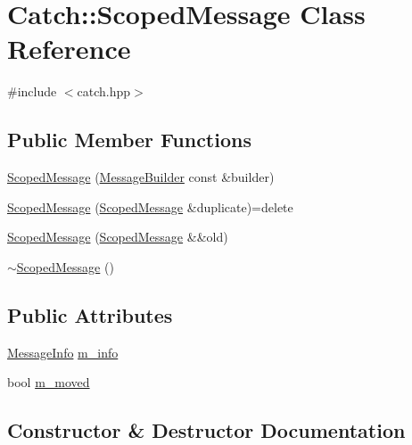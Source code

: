 \hypertarget{class_catch_1_1_scoped_message}{}\section{Catch\+::Scoped\+Message Class Reference}
\label{class_catch_1_1_scoped_message}


{\ttfamily \#include $<$catch.\+hpp$>$}

\subsection*{Public Member Functions}
\begin{DoxyCompactItemize}
\item 
\mbox{\hyperlink{class_catch_1_1_scoped_message_a5cc59f0f2ebe840e6607f83004d49a17}{Scoped\+Message}} (\mbox{\hyperlink{struct_catch_1_1_message_builder}{Message\+Builder}} const \&builder)
\item 
\mbox{\hyperlink{class_catch_1_1_scoped_message_a5fe2e79afdfd737818c15edfc49f378e}{Scoped\+Message}} (\mbox{\hyperlink{class_catch_1_1_scoped_message}{Scoped\+Message}} \&duplicate)=delete
\item 
\mbox{\hyperlink{class_catch_1_1_scoped_message_aac833a6a2245a26e6bd5c9252ca1caa0}{Scoped\+Message}} (\mbox{\hyperlink{class_catch_1_1_scoped_message}{Scoped\+Message}} \&\&old)
\item 
\mbox{\hyperlink{class_catch_1_1_scoped_message_a43190843f9eeb84a0b42b0bc95fdf93a}{$\sim$\+Scoped\+Message}} ()
\end{DoxyCompactItemize}
\subsection*{Public Attributes}
\begin{DoxyCompactItemize}
\item 
\mbox{\hyperlink{struct_catch_1_1_message_info}{Message\+Info}} \mbox{\hyperlink{class_catch_1_1_scoped_message_ae6e1476f389cc6e1586f033b3747b27b}{m\+\_\+info}}
\item 
bool \mbox{\hyperlink{class_catch_1_1_scoped_message_a4fe5607c1f7407240a0da8405b1c12e7}{m\+\_\+moved}}
\end{DoxyCompactItemize}


\subsection{Constructor \& Destructor Documentation}
\mbox{\label{class_catch_1_1_scoped_message_a5cc59f0f2ebe840e6607f83004d49a17}} 
